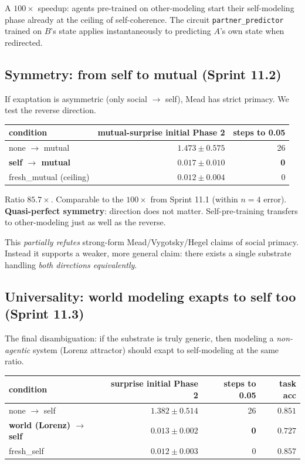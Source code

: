 \documentclass[11pt]{article}
\begin{document}
A $100\times$ speedup: agents pre-trained on other-modeling start their self-modeling phase already at the ceiling of self-coherence. The circuit \texttt{partner\_predictor} trained on $B$'s state applies instantaneously to predicting $A$'s own state when redirected.

\subsection{Symmetry: from self to mutual (Sprint 11.2)}

If exaptation is asymmetric (only social $\to$ self), Mead has strict primacy. We test the reverse direction.

\begin{table}[h]\centering\small
\begin{tabular}{lrr}
\toprule
condition & mutual-surprise initial Phase 2 & steps to 0.05 \\
\midrule
none $\to$ mutual & $1.473 \pm 0.575$ & 26 \\
\textbf{self $\to$ mutual} & $\mathbf{0.017 \pm 0.010}$ & \textbf{0} \\
fresh\_mutual (ceiling) & $0.012 \pm 0.004$ & 0 \\
\bottomrule
\end{tabular}
\end{table}

Ratio $85.7\times$. Comparable to the $100\times$ from Sprint 11.1 (within $n{=}4$ error). \textbf{Quasi-perfect symmetry}: direction does not matter. Self-pre-training transfers to other-modeling just as well as the reverse.

This \emph{partially refutes} strong-form Mead/Vygotsky/Hegel claims of social primacy. Instead it supports a weaker, more general claim: there exists a single substrate handling \emph{both directions equivalently}.

\subsection{Universality: world modeling exapts to self too (Sprint 11.3)}

The final disambiguation: if the substrate is truly generic, then modeling a \emph{non-agentic} system (Lorenz attractor) should exapt to self-modeling at the same ratio.

\begin{table}[h]\centering\small
\begin{tabular}{lrrr}
\toprule
condition & surprise initial Phase 2 & steps to 0.05 & task acc \\
\midrule
none $\to$ self & $1.382 \pm 0.514$ & 26 & $0.851$ \\
\textbf{world (Lorenz) $\to$ self} & $\mathbf{0.013 \pm 0.002}$ & \textbf{0} & $0.727$ \\
fresh\_self & $0.012 \pm 0.003$ & 0 & $0.857$ \\
\bottomrule
\end{tabular}
\end{table}
\end{document}
